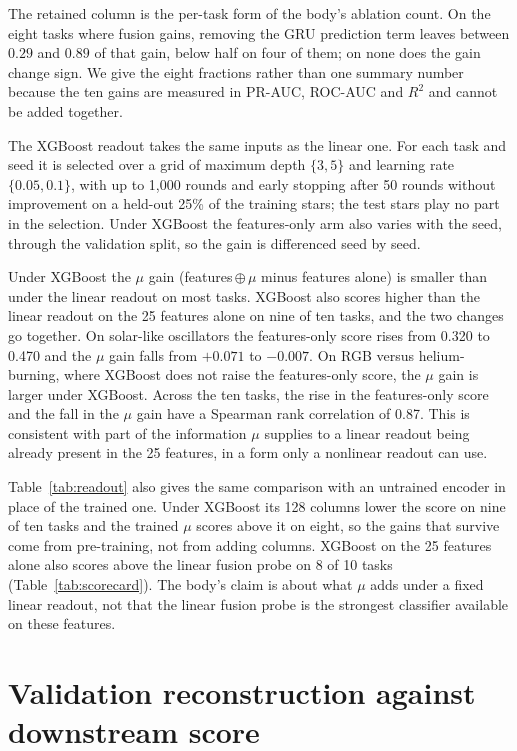\documentclass{article}
\begin{document}
The retained column is the per-task form of the body's ablation count. On the eight tasks where
fusion gains, removing the GRU prediction term leaves between $0.29$ and $0.89$ of that gain, below
half on four of them; on none does the gain change sign. We give the eight fractions rather
than one summary number because the ten gains are measured in PR-AUC, ROC-AUC and $R^{2}$ and cannot
be added together.

The XGBoost readout takes the same inputs as the linear one. For each task and seed it is selected
over a grid of maximum depth $\{3,5\}$ and learning rate $\{0.05,0.1\}$, with up to 1{,}000 rounds
and early stopping after 50 rounds without improvement on a held-out 25\% of the training stars;
the test stars play no part in the selection. Under XGBoost the features-only arm also varies with
the seed, through the validation split, so the gain is differenced seed by seed.

Under XGBoost the $\mu$ gain (features\,$\oplus\,\mu$ minus features alone) is smaller than under the
linear readout on most tasks. XGBoost also scores higher than the linear readout on the 25 features
alone on nine of ten tasks, and the two changes go together. On solar-like oscillators the features-only score rises from
0.320 to 0.470 and the $\mu$ gain falls from $+0.071$ to $-0.007$. On RGB versus helium-burning,
where XGBoost does not raise the features-only score, the $\mu$ gain is larger under XGBoost. Across
the ten tasks, the rise in the features-only score and the fall in the $\mu$ gain have a Spearman rank
correlation of 0.87. This is consistent with part of the information $\mu$ supplies to a linear
readout being already present in the 25 features, in a form only a nonlinear readout can use.

Table~\ref{tab:readout} also gives the same comparison with an untrained encoder in place of the
trained one. Under XGBoost its 128 columns lower the score on nine of ten tasks and the trained $\mu$
scores above it on eight, so the gains that survive come from pre-training, not from adding columns.
XGBoost on the 25 features alone also scores above the linear fusion probe on 8 of 10 tasks
(Table~\ref{tab:scorecard}). The body's claim is about what $\mu$ adds under a fixed linear readout,
not that the linear fusion probe is the strongest classifier available on these features.

\section{Validation reconstruction against downstream score}
\label{app:valloss}
\end{document}
